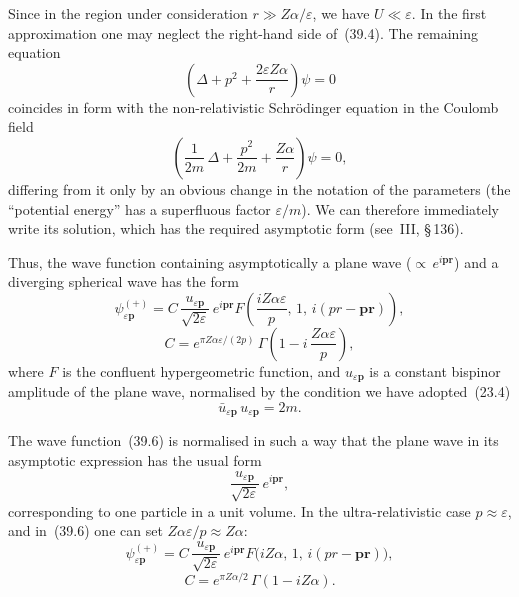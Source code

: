 Since in the region under consideration $r \gg Z\alpha/\varepsilon$, we have $U \ll \varepsilon$. In the first approximation one may neglect the right-hand side of~(39.4). The remaining equation
\begin{equation}
\left(\Delta + p^2 + \frac{2\varepsilon Z\alpha}{r}\right)\psi = 0
\tag{39.5}
\end{equation}
coincides in form with the non-relativistic Schr\"odinger equation in the Coulomb field
\begin{equation}
\left(\frac{1}{2m}\,\Delta + \frac{p^2}{2m} + \frac{Z\alpha}{r}\right)\psi = 0,
\tag{39.5a}
\end{equation}
differing from it only by an obvious change in the notation of the parameters (the ``potential energy'' has a superfluous factor $\varepsilon/m$). We can therefore immediately write its solution, which has the required asymptotic form (see~III, \S\,136).

Thus, the wave function containing asymptotically a plane wave (${\propto}\,e^{i\mathbf{p}\mathbf{r}}$) and a diverging spherical wave has the form
\begin{equation}
\psi^{(+)}_{\varepsilon\mathbf{p}} = C\,\frac{u_{\varepsilon\mathbf{p}}}{\sqrt{2\varepsilon}}\,e^{i\mathbf{p}\mathbf{r}}F\!\left(\frac{iZ\alpha\varepsilon}{p},\,1,\,i(pr - \mathbf{p}\mathbf{r})\right),
\tag{39.6}
\end{equation}
\[
C = e^{\pi Z\alpha\varepsilon/(2p)}\,\Gamma\!\left(1 - i\,\frac{Z\alpha\varepsilon}{p}\right),
\]
where $F$ is the confluent hypergeometric function, and $u_{\varepsilon\mathbf{p}}$ is a constant bispinor amplitude of the plane wave, normalised by the condition we have adopted~(23.4)
\begin{equation}
\bar u_{\varepsilon\mathbf{p}}\,u_{\varepsilon\mathbf{p}} = 2m.
\tag{39.7}
\end{equation}

The wave function~(39.6) is normalised in such a way that the plane wave in its asymptotic expression has the usual form
\[
\frac{u_{\varepsilon\mathbf{p}}}{\sqrt{2\varepsilon}}\,e^{i\mathbf{p}\mathbf{r}},
\]
corresponding to one particle in a unit volume. In the ultra-relativistic case $p \approx \varepsilon$, and in~(39.6) one can set $Z\alpha\varepsilon/p \approx Z\alpha$:
\begin{equation}
\psi^{(+)}_{\varepsilon\mathbf{p}} = C\,\frac{u_{\varepsilon\mathbf{p}}}{\sqrt{2\varepsilon}}\,e^{i\mathbf{p}\mathbf{r}}F\bigl(iZ\alpha,\,1,\,i(pr - \mathbf{p}\mathbf{r})\bigr),
\tag{39.8}
\end{equation}
\[
C = e^{\pi Z\alpha/2}\,\Gamma(1 - iZ\alpha).
\]

